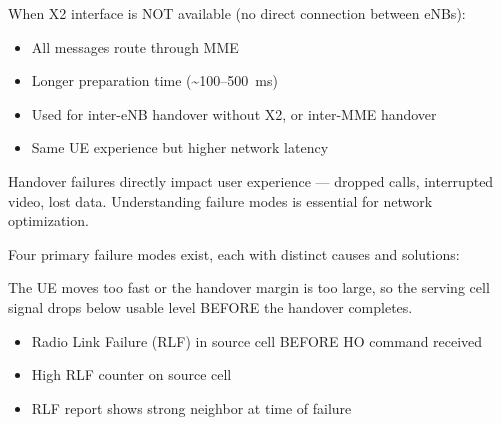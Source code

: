 
When X2 interface is NOT available (no direct connection between eNBs):

\begin{itemize}
\tightlist
\item
  All messages route through MME
\item
  Longer preparation time (\textasciitilde{}100–500~ms)
\item
  Used for inter-eNB handover without X2, or inter-MME handover
\item
  Same UE experience but higher network latency
\end{itemize}



\CNchained{}

Handover failures directly impact user experience — dropped calls, interrupted video, lost data. Understanding failure modes is essential for network optimization.


Four primary failure modes exist, each with distinct causes and solutions:



\CNchained{}

The UE moves too fast or the handover margin is too large, so the serving cell signal drops below usable level BEFORE the handover completes.





\begin{itemize}
\tightlist
\item
  Radio Link Failure (RLF) in source cell BEFORE HO command received
\item
  High RLF counter on source cell
\item
  RLF report shows strong neighbor at time of failure
\end{itemize}


